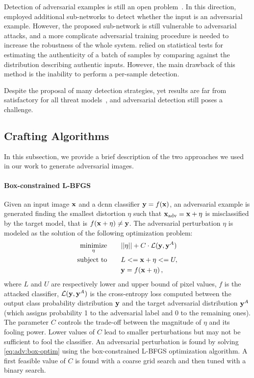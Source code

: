 Detection of adversarial examples is still an open problem~\cite{papernot2016limitations}.
In this direction, \citet{gong2017adversarial,metzen2017detecting} employed additional sub-networks to detect whether the input is an adversarial example.
However, the proposed sub-network is still vulnerable to adversarial attacks, and a more complicate adversarial training procedure is needed to increase the robustness of the whole system.
\citet{feinman2017detecting,grosse2017statistical} relied on statistical tests for estimating the authenticity of a batch of samples by comparing against the distribution describing authentic inputs.
However, the main drawback of this method is the inability to perform a per-sample detection.

Despite the proposal of many detection strategies, yet results are far from satisfactory for all threat models~\cite{carlini2017adversarial}, and adversarial detection still poses a challenge.

\subsection{Crafting Algorithms}
\label{sec:adv:algos}
In this subsection, we provide a brief description of the two approaches %
we used in our work to generate adversarial images.
\paragraph{Box-constrained L-BFGS~\cite{tabacof2016exploring,szegedy2013intriguing}}
Given an input image $\mathbf{x}$ and a \gls{dcnn} classifier $\mathbf{y} = f(\mathbf{x})$, an adversarial example is generated finding the smallest distortion $\eta$ such that $\mathbf{x}_\text{adv} = \mathbf{x} + \eta$ is misclassified by the target model, that is $f(\mathbf{x}+\eta) \neq \mathbf{y}$.
The adversarial perturbation $\eta$ is modeled as the solution of the following optimization problem:
\begin{equation} \label{eq:adv:box-optim}
\begin{split}
\underset{\eta}{\text{minimize}}&\qquad ||\eta|| + C \cdot \mathcal{L}(\mathbf{y},\mathbf{y}^A) \\
\text{subject to} 				&\qquad L <= \mathbf{x}+\eta <= U, \\
                                &\qquad \mathbf{y} = f(\mathbf{x}+\eta) \,,
\end{split}
\end{equation}
where $L$ and $U$ are respectively lower and upper bound of pixel values, $f$ is the attacked classifier, $\mathcal{L}(\mathbf{y},\mathbf{y}^A)$ is the cross-entropy loss computed between the output class probability distribution $\mathbf{y}$ and the target adversarial distribution $\mathbf{y}^A$ (which assigns probability 1 to the adversarial label and 0 to the remaining ones).
The parameter $C$ controls the trade-off between the magnitude of $\eta$ and its fooling power.
Lower values of $C$ lead to smaller perturbations but may not be sufficient to fool the classifier.
An adversarial perturbation is found by solving \ref{eq:adv:box-optim} using the box-constrained L-BFGS optimization algorithm.
A first feasible value of $C$ is found with a coarse grid search and then tuned with a binary search.

